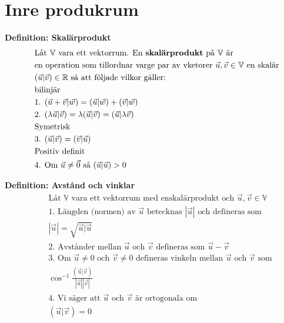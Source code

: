 \section{Inre produkrum}
\textbf{Definition: Skalärprodukt}
\begin{align*}
  &\quad  \text{Låt $\mathbb{V}$ vara ett vektorrum. En \textbf{skalärprodukt} på $\mathbb{V}$ är} \\
  &\quad  \text{en operation som tillordnar varge par av vketorer $\vec{u},\vec{v}\in\mathbb{V}$ en skalär} \\
  &\quad  \text{$(\vec{u}|\vec{v})\in\mathbb{R}$ så att följade vilkor gäller:} \\
  &\quad  \text{bilinjär} \\
  &\quad  \text{1. }  (\vec{u} + \vec{v}|\vec{w}) = (\vec{u}|\vec{w}) + (\vec{v}|\vec{w}) \\
  &\quad  \text{2. }  (\lambda\vec{u}|\vec{v}) = \lambda(\vec{u}|\vec{v}) = (\vec{u}|\lambda\vec{v}) \\
  &\quad  \text{Symetrisk} \\
  &\quad  \text{3. }  (\vec{u}|\vec{v}) = (\vec{v}|\vec{u}) \\
  &\quad  \text{Positiv definit} \\
  &\quad  \text{4. Om } \vec{u}\neq\vec{0} \text{ så } (\vec{u}|\vec{u}) > 0 \\
\end{align*}

\textbf{Definition: Avstånd och vinklar}
\begin{align*}
  &\quad  \text{Låt $\mathbb{V}$ vara ett vektorrum med enskalärprodukt och $\vec{u},\vec{v}\in\mathbb{V}$} \\
  &\quad  \text{1. Längden (normen) av $\vec{u}$ betecknas $|\vec{u}|$ och defineras som} \\
  &\quad  |\vec{u}|=\sqrt{\vec{u}|\vec{u}} \\
  &\quad  \text{2. Avstånder mellan $\vec{u}$ och $\vec{v}$ defineras som $\vec{u}-\vec{v}$}  \\
  &\quad  \text{3. Om $\vec{u}\neq{0}$ och $\vec{v}\neq{0}$ defineras vinkeln mellan
    $\vec{u}$ och $\vec{v}$ som}  \\
  &\quad  \cos^{-1}\frac{(\vec{u}|\vec{v})}{|\vec{u}||\vec{v}|} \\
  &\quad  \text{4. Vi säger att $\vec{u}$ och $\vec{v}$ är ortogonala om } \\
  &\quad  (\vec{u}|\vec{v})=0 \\
\end{align*}

